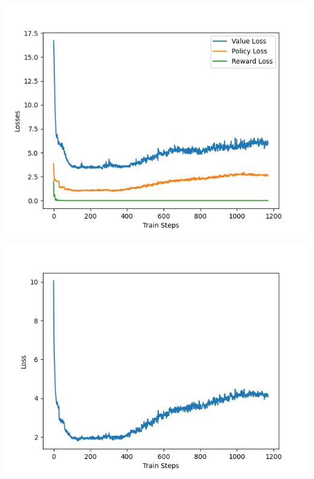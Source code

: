 \documentclass[12pt]{article}
\begin{document}
\begin{tcolorbox}[height=45em, width=\textwidth]
\begin{center}
    \begin{minipage}{0.48\textwidth}
        \includegraphics[width=\textwidth]{outputs/plots/sim_50/training/individual_losses.png}
    \end{minipage}
    \hfill
    \begin{minipage}{0.48\textwidth}
        \includegraphics[width=\textwidth]{outputs/plots/sim_50/training/total_loss.png}
    \end{minipage}
    
    \vspace{1em}
    

\end{center}
\end{tcolorbox}
\end{document}
